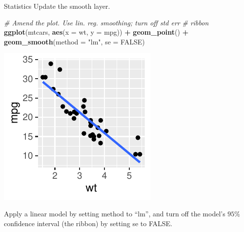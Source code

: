 \documentclass[
  ignorenonframetext,
]{beamer}
\newenvironment{Shaded}{\begin{snugshade}}{\end{snugshade}}
\newcommand{\AttributeTok}[1]{\textcolor[rgb]{0.13,0.29,0.53}{#1}}
\newcommand{\CommentTok}[1]{\textcolor[rgb]{0.56,0.35,0.01}{\textit{#1}}}
\newcommand{\ConstantTok}[1]{\textcolor[rgb]{0.56,0.35,0.01}{#1}}
\newcommand{\FunctionTok}[1]{\textcolor[rgb]{0.13,0.29,0.53}{\textbf{#1}}}
\newcommand{\NormalTok}[1]{#1}
\newcommand{\SpecialCharTok}[1]{\textcolor[rgb]{0.81,0.36,0.00}{\textbf{#1}}}
\newcommand{\StringTok}[1]{\textcolor[rgb]{0.31,0.60,0.02}{#1}}
\begin{document}
\begin{frame}[fragile]{Statistics}
\label{statistics-7}
Update the smooth layer.


\begin{Shaded}
\begin{Highlighting}[]
\CommentTok{\# Amend the plot. Use lin. reg. smoothing; turn off std err}
\CommentTok{\# ribbon}
\FunctionTok{ggplot}\NormalTok{(mtcars, }\FunctionTok{aes}\NormalTok{(}\AttributeTok{x =}\NormalTok{ wt, }\AttributeTok{y =}\NormalTok{ mpg)) }\SpecialCharTok{+} \FunctionTok{geom\_point}\NormalTok{() }\SpecialCharTok{+} \FunctionTok{geom\_smooth}\NormalTok{(}\AttributeTok{method =} \StringTok{"lm"}\NormalTok{,}
    \AttributeTok{se =} \ConstantTok{FALSE}\NormalTok{)}
\end{Highlighting}
\end{Shaded}

\begin{center}\includegraphics[width=0.5\linewidth]{Figs/unnamed-chunk-4-1} \end{center}

Apply a linear model by setting method to ``lm'', and turn off the
model's \(95\%\) confidence interval (the ribbon) by setting se to
FALSE.
\end{frame}
\end{document}
